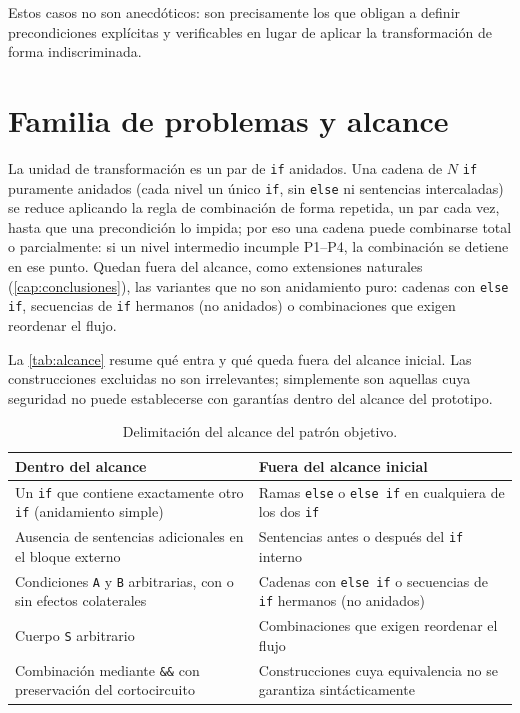 \noindent Estos casos no son anecdóticos: son precisamente los que obligan a
definir precondiciones explícitas y verificables en lugar de aplicar la
transformación de forma indiscriminada.

\section{Familia de problemas y alcance}
\label{sec:alcance}

La unidad de transformación es un par de \lstinline|if| anidados. Una cadena de
$N$ \lstinline|if| puramente anidados (cada nivel un único \lstinline|if|, sin
\lstinline|else| ni sentencias intercaladas) se reduce aplicando la regla de
combinación de forma repetida, un par cada vez, hasta que una precondición lo
impida; por eso una cadena puede combinarse total o parcialmente: si un nivel
intermedio incumple P1--P4, la combinación se detiene en ese punto. Quedan
fuera del alcance, como extensiones naturales (\autoref{cap:conclusiones}), las
variantes que no son anidamiento puro: cadenas con \lstinline|else if|,
secuencias de \lstinline|if| hermanos (no anidados) o combinaciones que exigen
reordenar el flujo.

La \autoref{tab:alcance} resume qué entra y qué queda fuera del alcance
inicial. Las construcciones excluidas no son irrelevantes; simplemente son
aquellas cuya seguridad no puede establecerse con garantías dentro del alcance
del prototipo.

\begin{table}[ht]
\centering
\caption{Delimitación del alcance del patrón objetivo.}
\label{tab:alcance}
\begin{tabular}{@{}p{6.1cm}p{6.1cm}@{}}
\toprule
\textbf{Dentro del alcance} & \textbf{Fuera del alcance inicial} \\
\midrule
Un \lstinline|if| que contiene exactamente otro \lstinline|if| (anidamiento simple)
  & Ramas \lstinline|else| o \lstinline|else if| en cualquiera de los dos \lstinline|if| \\
Ausencia de sentencias adicionales en el bloque externo
  & Sentencias antes o después del \lstinline|if| interno \\
Condiciones \lstinline|A| y \lstinline|B| arbitrarias, con o sin efectos colaterales
  & Cadenas con \lstinline|else if| o secuencias de \lstinline|if| hermanos (no anidados) \\
Cuerpo \lstinline|S| arbitrario
  & Combinaciones que exigen reordenar el flujo \\
Combinación mediante \lstinline|&&| con preservación del cortocircuito
  & Construcciones cuya equivalencia no se garantiza sintácticamente \\
\bottomrule
\end{tabular}
\end{table}